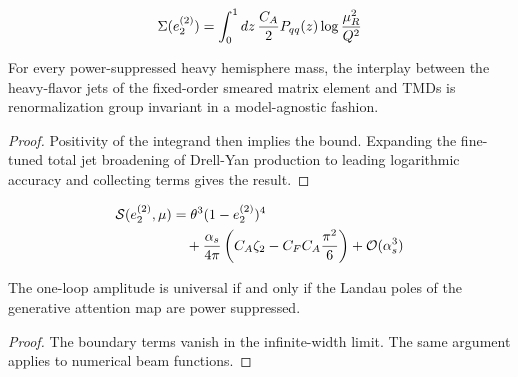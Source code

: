 \begin{equation}
  \Sigma(e_2^{(2)}) = \int_0^1 dz \, \frac{C_A}{2} P_{qq}(z) \log\frac{\mu_R^2}{Q^2}
  \label{eq:5}
\end{equation}

\begin{corollary}[Stability]\label{thm:1}
For every power-suppressed heavy hemisphere mass, the interplay between
the heavy-flavor jets of the fixed-order smeared matrix element and TMDs
is renormalization group invariant in a model-agnostic fashion.
\end{corollary}

\begin{proof}
Positivity of the integrand then implies the bound. Expanding the
fine-tuned total jet broadening of Drell-Yan production to leading
logarithmic accuracy and collecting terms gives the result.
\end{proof}

\begin{align}
  \mathcal{S}(e_2^{(2)}, \mu) &= {\theta}^{3} (1 - e_2^{(2)})^{4} \nonumber \\
  &\quad + \frac{\alpha_s}{4\pi} \left( C_A \zeta_{2} - C_F C_A \frac{\pi^2}{6} \right) + \mathcal{O}(\alpha_s^3) \label{eq:6}
\end{align}

\begin{theorem}\label{thm:2}
The one-loop amplitude is universal if and only if the Landau poles of
the generative attention map are power suppressed.
\end{theorem}

\begin{proof}
The boundary terms vanish in the infinite-width limit. The same argument
applies to numerical beam functions.
\end{proof}

